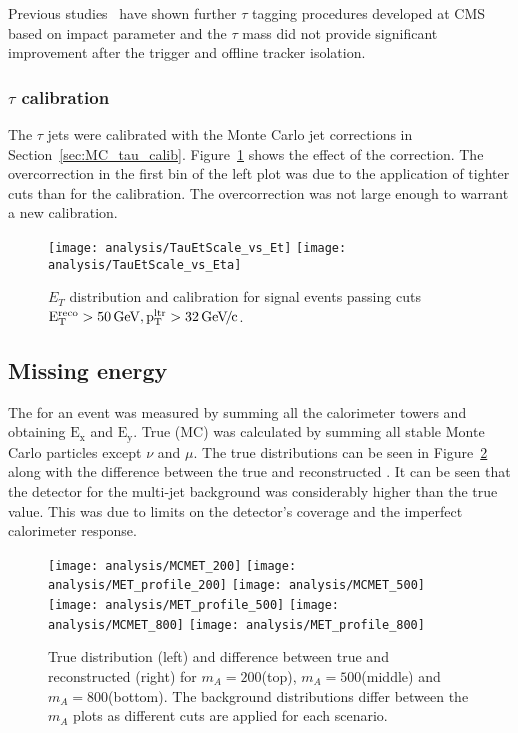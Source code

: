 Previous studies~\cite{CMS_TDR_PHYS_vol2} have shown further $\tau$ tagging procedures developed at CMS based on impact parameter and the $\tau$ mass did not provide significant improvement after the trigger and offline tracker isolation.

\subsubsection{$\tau$ \ET calibration}
The $\tau$ jets were calibrated with the Monte Carlo jet \ET corrections in Section~\ref{sec:MC_tau_calib}. Figure~\ref{fig:analysis_tau_scale} shows the effect of the correction. The overcorrection in the first \ET bin of the left plot was due to the application of tighter cuts than for the calibration. The overcorrection was not large enough to warrant a new calibration.

\begin{figure}[!Hhtb]
\centering
\texttt{[image: analysis/TauEtScale\_vs\_Et]}
\texttt{[image: analysis/TauEtScale\_vs\_Eta]}
\caption{$E_{T}$ distribution and calibration for signal events passing cuts $\mathrm{E_{T}^{reco} > 50} \,\mathrm{Ge\hspace{-.08em}V}, \mathrm{p_{T}^{ltr}} > 32 {\,\mathrm{Ge}\hspace{-.08em}\mathrm{V}\hspace{-0.16em}/\hspace{-0.08em}\mathrm{c}}$.\label{fig:analysis_tau_scale}}
\end{figure}

\subsection{Missing energy}
The \MET for an event was measured by summing all the calorimeter towers and obtaining $\mathrm{E_{x}}$ and $\mathrm{E_{y}}$. True (MC) \MET was calculated by summing all stable Monte Carlo particles except $\nu$ and $\mu$. The true \MET distributions can be seen in Figure~\ref{fig:MET} along with the difference between the true and reconstructed \MET. It can be seen that the detector \MET for the multi-jet background was considerably higher than the true value. This was due to limits on the detector's coverage and the imperfect calorimeter response.

\begin{figure}[!Hhtb]
\centering
\texttt{[image: analysis/MCMET\_200]}
\texttt{[image: analysis/MET\_profile\_200]}
\texttt{[image: analysis/MCMET\_500]}
\texttt{[image: analysis/MET\_profile\_500]}
\texttt{[image: analysis/MCMET\_800]}
\texttt{[image: analysis/MET\_profile\_800]}
\caption{True \MET distribution (left) and difference between true and reconstructed \MET (right) for $m_{A}=200$\GeVcc (top), $m_{A}=500$\GeVcc (middle) and $m_{A}=800$\GeVcc (bottom). The background distributions differ between the $m_A$ plots as different cuts are applied for each scenario.\label{fig:MET}}
\end{figure}

